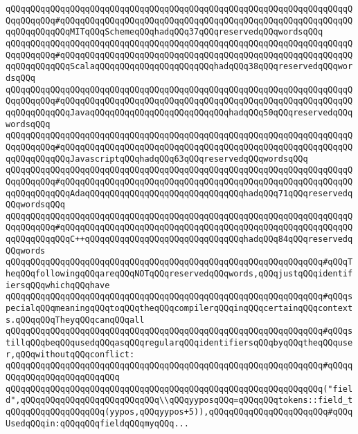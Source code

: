 \verb|qQQqqQQqqQQqqQQqqQQqqQQqqQQqqQQqqQQqqQQqqQQqqQQqqQQqqQQqqQQqqQQqqQQqqQQqqQQqqQQq#qQQqqQQqqQQqqQQqqQQqqQQqqQQqqQQqqQQqqQQqqQQqqQQqqQQqqQQqqQQqqQQqqQQqqQQqMITqQQqSchemeqQQqhadqQQq37qQQqreservedqQQqwordsqQQq|\newline
\verb|qQQqqQQqqQQqqQQqqQQqqQQqqQQqqQQqqQQqqQQqqQQqqQQqqQQqqQQqqQQqqQQqqQQqqQQqqQQqqQQq#qQQqqQQqqQQqqQQqqQQqqQQqqQQqqQQqqQQqqQQqqQQqqQQqqQQqqQQqqQQqqQQqqQQqqQQqScalaqQQqqQQqqQQqqQQqqQQqqQQqhadqQQq38qQQqreservedqQQqwordsqQQq|\newline
\verb|qQQqqQQqqQQqqQQqqQQqqQQqqQQqqQQqqQQqqQQqqQQqqQQqqQQqqQQqqQQqqQQqqQQqqQQqqQQqqQQq#qQQqqQQqqQQqqQQqqQQqqQQqqQQqqQQqqQQqqQQqqQQqqQQqqQQqqQQqqQQqqQQqqQQqqQQqJavaqQQqqQQqqQQqqQQqqQQqqQQqqQQqhadqQQq50qQQqreservedqQQqwordsqQQq|\newline
\verb|qQQqqQQqqQQqqQQqqQQqqQQqqQQqqQQqqQQqqQQqqQQqqQQqqQQqqQQqqQQqqQQqqQQqqQQqqQQqqQQq#qQQqqQQqqQQqqQQqqQQqqQQqqQQqqQQqqQQqqQQqqQQqqQQqqQQqqQQqqQQqqQQqqQQqqQQqJavascriptqQQqhadqQQq63qQQqreservedqQQqwordsqQQq|\newline
\verb|qQQqqQQqqQQqqQQqqQQqqQQqqQQqqQQqqQQqqQQqqQQqqQQqqQQqqQQqqQQqqQQqqQQqqQQqqQQqqQQq#qQQqqQQqqQQqqQQqqQQqqQQqqQQqqQQqqQQqqQQqqQQqqQQqqQQqqQQqqQQqqQQqqQQqqQQqAdaqQQqqQQqqQQqqQQqqQQqqQQqqQQqqQQqhadqQQq71qQQqreservedqQQqwordsqQQq|\newline
\verb|qQQqqQQqqQQqqQQqqQQqqQQqqQQqqQQqqQQqqQQqqQQqqQQqqQQqqQQqqQQqqQQqqQQqqQQqqQQqqQQq#qQQqqQQqqQQqqQQqqQQqqQQqqQQqqQQqqQQqqQQqqQQqqQQqqQQqqQQqqQQqqQQqqQQqqQQqC++qQQqqQQqqQQqqQQqqQQqqQQqqQQqqQQqhadqQQq84qQQqreservedqQQqwords|\newline
\newline
\verb|qQQqqQQqqQQqqQQqqQQqqQQqqQQqqQQqqQQqqQQqqQQqqQQqqQQqqQQqqQQqqQQq#qQQqTheqQQqfollowingqQQqareqQQqNOTqQQqreservedqQQqwords,qQQqjustqQQqidentifiersqQQqwhichqQQqhave|\newline
\verb|qQQqqQQqqQQqqQQqqQQqqQQqqQQqqQQqqQQqqQQqqQQqqQQqqQQqqQQqqQQqqQQq#qQQqspecialqQQqmeaningqQQqtoqQQqtheqQQqcompilerqQQqinqQQqcertainqQQqcontexts.qQQqqQQqTheyqQQqcanqQQqall|\newline
\verb|qQQqqQQqqQQqqQQqqQQqqQQqqQQqqQQqqQQqqQQqqQQqqQQqqQQqqQQqqQQqqQQq#qQQqstillqQQqbeqQQqusedqQQqasqQQqregularqQQqidentifiersqQQqbyqQQqtheqQQquser,qQQqwithoutqQQqconflict:|\newline
\verb|qQQqqQQqqQQqqQQqqQQqqQQqqQQqqQQqqQQqqQQqqQQqqQQqqQQqqQQqqQQqqQQq#qQQqqQQqqQQqqQQqqQQqqQQqqQQq|\newline
\verb|qQQqqQQqqQQqqQQqqQQqqQQqqQQqqQQqqQQqqQQqqQQqqQQqqQQqqQQqqQQqqQQq("field",qQQqqQQqqQQqqQQqqQQqqQQqqQQq\\qQQqyyposqQQq=qQQqqQQqtokens::field_tqQQqqQQqqQQqqQQqqQQq(yypos,qQQqyypos+5)),qQQqqQQqqQQqqQQqqQQqqQQq#qQQqUsedqQQqin:qQQqqQQqfieldqQQqmyqQQq...|\newline
